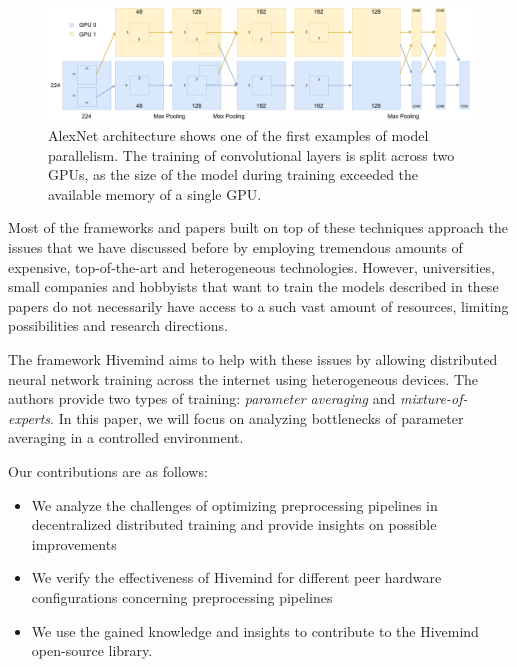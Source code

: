 \begin{figure}[h]
    \caption{AlexNet \cite{alexnet2012} architecture shows one of the first examples of model parallelism. The training of convolutional layers is split across two GPUs, as the size of the model during training exceeded the available memory of a single GPU.}
    \label{fig:alexnet}
    \includegraphics[width=\textwidth]{./figures/alexnet.pdf}
\end{figure}

Most of the frameworks and papers built on top of these techniques approach the issues that we have discussed before by employing tremendous amounts of expensive, top-of-the-art and heterogeneous technologies.
However, universities, small companies and hobbyists that want to train the models described in these papers do not necessarily have access to a such vast amount of resources, limiting possibilities and research directions.

The framework Hivemind \cite{riabinin2020hivemind} aims to help with these issues by allowing distributed neural network training across the internet using heterogeneous devices. The authors provide two types of training: \textit{parameter averaging} and \textit{mixture-of-experts}. In this paper, we will focus on analyzing bottlenecks of parameter averaging in a controlled environment.

Our contributions are as follows:
\begin{itemize}
    \item We analyze the challenges of optimizing preprocessing pipelines in decentralized distributed training and provide insights on possible improvements
    \item We verify the effectiveness of Hivemind for different peer hardware configurations concerning preprocessing pipelines
    \item We use the gained knowledge and insights to contribute to the Hivemind open-source library.
\end{itemize}
